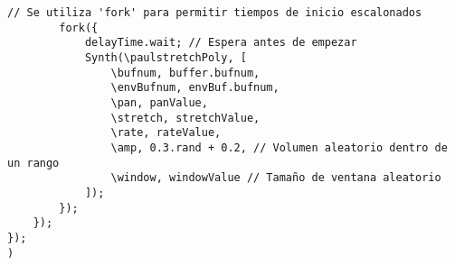 \begin{minipage}[t]{1\textwidth}
\begin{lstlisting}[style=SuperCollider-IDE, basicstyle=\footnotesize\ttfamily, numbers=none]
        // Se utiliza 'fork' para permitir tiempos de inicio escalonados
        fork({
            delayTime.wait; // Espera antes de empezar
            Synth(\paulstretchPoly, [
                \bufnum, buffer.bufnum,
                \envBufnum, envBuf.bufnum,
                \pan, panValue,
                \stretch, stretchValue,
                \rate, rateValue,
                \amp, 0.3.rand + 0.2, // Volumen aleatorio dentro de un rango
                \window, windowValue // Tamaño de ventana aleatorio
            ]);
        });
    });
});
)                                 
    \end{lstlisting}
    \vspace{1cm}
\end{minipage}






















